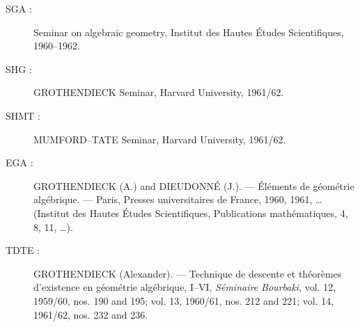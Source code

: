 \begin{description}
\item[SGA :] Seminar on algebraic geometry, Institut des Hautes Études
Scientifiques, 1960--1962.

\item[SHG :] GROTHENDIECK Seminar, Harvard University, 1961/62.

\item[SHMT :] MUMFORD--TATE Seminar, Harvard University, 1961/62.

\item[EGA :] GROTHENDIECK (A.) and DIEUDONNÉ (J.). --- Éléments de géométrie
algébrique. --- Paris, Presses universitaires de France, 1960, 1961, …
(Institut des Hautes Études Scientifiques, Publications mathématiques, 4, 8,
11, …).

\item[TDTE :] GROTHENDIECK (Alexander). --- Technique de descente et théorèmes
d'existence en géométrie algébrique, I--VI, \emph{Séminaire Bourbaki}, vol. 12,
1959/60, nos. 190 and 195; vol. 13, 1960/61, nos. 212 and 221; vol. 14, 1961/62,
nos. 232 and 236.
\end{description}
